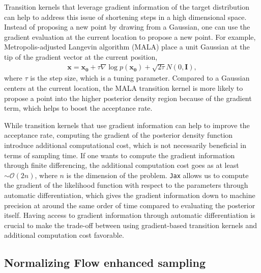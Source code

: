 \documentclass[twocolumn]{aastex631}
\begin{document}
Transition kernels that leverage gradient information of the target
distribution can help to address this issue of shortening steps in a high
dimensional space. Instead of proposing a new point by drawing from a Gaussian,
one can use the gradient evaluation at the current location to propose a new
point. For example, Metropolis-adjusted Langevin algorithm (MALA) \cite{10.2307/2346184}
place a unit Gaussian at the tip of the gradient vector at the current position,
\begin{align}
    \mathbf{x} = \mathbf{x_0} + \tau \nabla\log{p(\mathbf{x_0})} + \sqrt{2\tau}N(0,\mathbf{I}),
\end{align}
where $\tau$ is the step size, which is a tuning parameter. Compared to a
Gaussian centers at the current location, the MALA transition kernel is more
likely to propose a point into the higher posterior density region because of
the gradient term, which helps to boost the acceptance rate.

While transition kernels that use gradient information can help to improve the
acceptance rate, computing the gradient of the posterior density function
introduce additional computational cost, which is not necessarily beneficial in
terms of sampling time. If one wants to compute the gradient information through
finite differencing, the additional computation cost goes as at least $\sim
\mathcal{O}(2n)$, where $n$ is the dimension of the problem. \texttt{Jax} allows
us to compute the gradient of the likelihood function with respect to the
parameters through automatic differentiation, which gives the gradient
information down to machine precision at around the same order of time compared
to evaluating the posterior itself. Having access to gradient information
through automatic differentiation is crucial to make the trade-off between using
gradient-based transition kernels and additional computation cost favorable.

\subsection{Normalizing Flow enhanced sampling}
\label{sec:flow}
\end{document}
